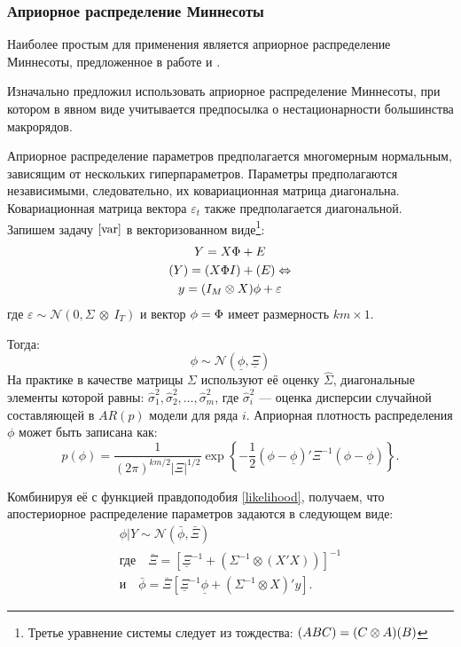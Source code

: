 \documentclass[11pt]{article} %
\let\vec\relax
\DeclareMathOperator{\vec}{vec}
\newcommand{\cN}{\mathcal{N}}
\begin{document}
\subsubsection{Априорное распределение Миннесоты}


Наиболее простым для применения является априорное распределение Миннесоты, предложенное в работе  \cite{litterman_1986_forecasting} и \cite{doan_litterman_sims_1984_forecasting}.

Изначально \cite{litterman_1986_forecasting} предложил использовать априорное распределение Миннесоты, при котором в явном виде учитывается предпосылка о нестационарности большинства макрорядов.


Априорное распределение параметров предполагается многомерным нормальным, зависящим от нескольких гиперпараметров. Параметры предполагаются независимыми, следовательно, их ковариационная матрица диагональна. Ковариационная матрица вектора $\varepsilon_t$ также предполагается диагональной. Запишем задачу $\eqref{var}$ в векторизованном виде\footnote{Третье уравнение системы следует из тождества: $\vec(ABC)=(C\otimes A)\vec (B)$}:
\begin{gather*}
Y=X\Phi+E\\
\vec(Y)=\vec(X\Phi I)+\vec(E)\Leftrightarrow \\
y=(I_M\otimes X)\phi + \varepsilon
\end{gather*}
где $\varepsilon  \sim \cN(0,\varSigma\ \otimes\ I_T)$ и вектор $\phi=\vec{\Phi}$ имеет размерность $km\times 1$.

Тогда:
\begin{equation}
\phi\sim \cN(\underline \phi, \underline \Xi)
\end{equation}
На практике в качестве матрицы $\Sigma$ используют её оценку $\hat\Sigma$, диагональные элементы которой равны: $\hat\sigma_{1}^2, \hat\sigma_{2}^2,\ldots,\hat\sigma_{m}^2 $, где  $\hat\sigma_{i}^2$ --- оценка дисперсии случайной составляющей в $AR(p)$ модели для ряда $i$.
Априорная плотность распределения $\phi$ может быть записана как:
\begin{equation}
p(\phi)=\frac{1}{(2\pi)^{km/2}|\Xi|^{1/2}} \exp \left\lbrace-\frac{1}{2}(\phi-\underline \phi)'\Xi^{-1}(\phi-\underline \phi ) \right\rbrace.
\end{equation}

Комбинируя её с функцией правдоподобия \eqref{likelihood}, получаем, что апостериорное распределение параметров задаются в следующем виде:
\begin{gather}
\phi|Y\sim \cN(\bar{\phi},\bar \Xi)\\
\text{где}\quad \bar \Xi=[\underline \Xi^{-1}+(\varSigma^{-1}\otimes(X'X))]^{-1}\\
\text{и}\quad \bar{\phi}=\bar{\Xi}[\underline \Xi^{-1}\underline \phi+(\varSigma^{-1}\otimes X)'y].
\end{gather}
\end{document}
